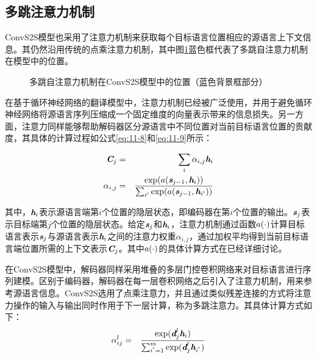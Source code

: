 
\subsection{多跳注意力机制}

\parinterval ConvS2S模型也采用了注意力机制来获取每个目标语言位置相应的源语言上下文信息。其仍然沿用传统的点乘注意力机制，其中图\ref{fig:11-16}蓝色框代表了多跳自注意力机制在模型中的位置。

\begin{figure}[htp]
\centering

\caption{多跳自注意力机制在ConvS2S模型中的位置（蓝色背景框部分）}
\label{fig:11-16}
\end{figure}

\parinterval 在基于循环神经网络的翻译模型中，注意力机制已经被广泛使用，并用于避免循环神经网络将源语言序列压缩成一个固定维度的向量表示带来的信息损失。另一方面，注意力同样能够帮助解码器区分源语言中不同位置对当前目标语言位置的贡献度，其具体的计算过程如公式\eqref{eq:11-8}和\eqref{eq:11-9}所示：

\begin{eqnarray}
\textbf{\em C}_j &=& \sum_i \alpha_{i,j} \textbf{\em h}_i \label{eq:11-8} \\
\alpha_{i,j} &=& \frac{ \textrm{exp}({a} (\textbf{\em s}_{j-1},\textbf{\em h}_i))  }{\sum_{i'} \textrm{exp}( {a} (\textbf{\em s}_{j-1},\textbf{\em h}_{i'}))} \label{eq:11-9}
\end{eqnarray}

\noindent 其中，$\textbf{\em h}_i$表示源语言端第$i$个位置的隐层状态，即编码器在第$i$个位置的输出。$\textbf{\em s}_j$表示目标端第$j$个位置的隐层状态。给定$\textbf{\em s}_j$和$\textbf{\em h}_i$，注意力机制通过函数${a}(\cdot)$计算目标语言表示$\textbf{\em s}_j$与源语言表示$\textbf{\em h}_i$之间的注意力权重$\alpha_{i,j}$，通过加权平均得到当前目标语言端位置所需的上下文表示$\textbf{\em C}_j$。其中${a}(\cdot)$的具体计算方式在{\chapterten}已经详细讨论。

\parinterval 在ConvS2S模型中，解码器同样采用堆叠的多层门控卷积网络来对目标语言进行序列建模。区别于编码器，解码器在每一层卷积网络之后引入了注意力机制，用来参考源语言信息。ConvS2S选用了点乘注意力，并且通过类似残差连接的方式将注意力操作的输入与输出同时作用于下一层计算，称为多跳注意力。其具体计算方式如下：
\begin{eqnarray}
\alpha_{ij}^l &=& \frac{ \textrm{exp} (\textbf{\em d}_{j}^l\textbf{\em h}_i) }{\sum_{i^{'}=1}^m \textrm{exp} (\textbf{\em d}_{j}^l\textbf{\em h}_{i^{'}})}
\label{eq:11-10}
\end{eqnarray}

